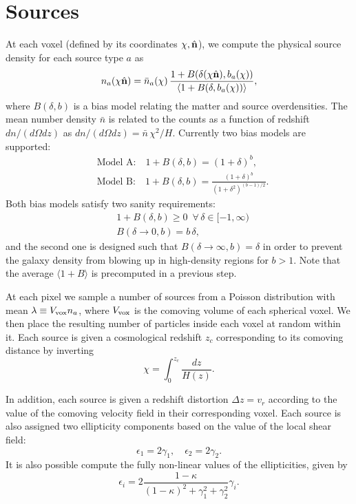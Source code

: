 \documentclass[a4paper,10pt]{article}
\newcommand{\nv}{\hat{\bf n}}
\begin{document}
\section{Sources}
  At each voxel (defined by its coordinates $\chi,\nv$), we compute the physical source
  density for each source type $a$ as
  \begin{equation}
    n_a(\chi\nv)=
    \bar{n}_a(\chi)\,\frac{1+B(\delta(\chi\nv),b_a(\chi))}{\langle1+B(\delta,b_a(\chi))\rangle},
  \end{equation}
  where $B(\delta,b)$ is a bias model relating the matter and source overdensities. The mean number density $\bar{n}$ is related to the counts as a function of redshift $dn/(d\Omega dz)$ as $dn/(d\Omega dz)=\bar{n}\,\chi^2/H$. Currently two bias models are supported:
  \begin{align}
    &\text{Model A:}\hspace{12pt}1+B(\delta,b)=(1+\delta)^b,\\
    &\text{Model B:}\hspace{12pt}1+B(\delta,b)=\frac{(1+\delta)^b}{(1+\delta^2)^{(b-1)/2}}.
  \end{align}
  Both bias models satisfy two sanity requirements:
  \begin{align}
    &1+B(\delta,b)\geq0\hspace{6pt}\forall\,\delta\in[-1,\infty)\\
    &B(\delta\rightarrow0,b)=b\,\delta,
  \end{align}
  and the second one is designed such that $B(\delta\rightarrow\infty,b)=\delta$ in order to prevent the galaxy density from blowing up in high-density regions for $b>1$. Note that the average $\langle1+B\rangle$ is precomputed in a previous step.

  At each pixel we sample a number of sources from a Poisson distribution with mean $\lambda\equiv V_{\rm vox}n_a$, where $V_{\rm vox}$ is the comoving volume of each spherical voxel. We then place the resulting number of particles inside each voxel at random within it. Each source is given a cosmological redshift $z_c$ corresponding to its comoving distance by inverting
  \begin{equation}
    \chi=\int_0^{z_c}\frac{dz}{H(z)}.
  \end{equation}

  In addition, each source is given a redshift distortion $\Delta z=v_r$ according to the value of the comoving velocity field in their corresponding voxel. Each source is also assigned two ellipticity components based on the value of the local shear field:
  \begin{equation}
    \epsilon_1=2\gamma_1,\hspace{12pt}\epsilon_2=2\gamma_2.
  \end{equation}
  It is also possible compute the fully non-linear values of the ellipticities, given by
  \begin{equation}
    \epsilon_i=2\frac{1-\kappa}{(1-\kappa)^2+\gamma_1^2+\gamma_2^2}\gamma_i.
  \end{equation}
\end{document}
